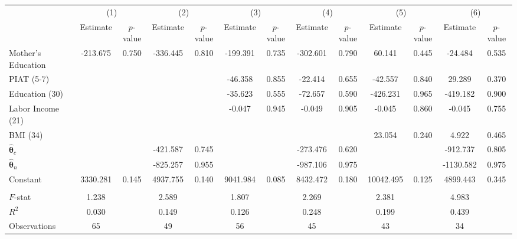 \begin{tabular}{lcccccccccccc} \toprule
 & \multicolumn{2}{c}{(1)}  &  \multicolumn{2}{c}{(2)}  &  \multicolumn{2}{c}{(3)}  &  \multicolumn{2}{c}{(4)}  & \multicolumn{2}{c}{(5)} & \multicolumn{2}{c}{(6)} \\  
 & Estimate & $p$-value & Estimate & $p$-value & Estimate & $p$-value & Estimate & $p$-value & Estimate & $p$-value & Estimate & $p$-value \\ \midrule
Mother's Education &  -213.675 &     0.750 &  -336.445 &     0.810 &  -199.391 &     0.735 &  -302.601 &     0.790 &    60.141 &     0.445 &   -24.484 &     0.535 \\  
PIAT (5-7) &         &         &         &         &   -46.358 &     0.855 &   -22.414 &     0.655 &   -42.557 &     0.840 &    29.289 &     0.370 \\  
Education (30) &         &         &         &         &   -35.623 &     0.555 &   -72.657 &     0.590 &  -426.231 &     0.965 &  -419.182 &     0.900 \\  
Labor Income (21) &         &         &         &         &    -0.047 &     0.945 &    -0.049 &     0.905 &    -0.045 &     0.860 &    -0.045 &     0.755 \\  
BMI (34) &         &         &         &         &         &         &         &         &    23.054 &     0.240 &     4.922 &     0.465 \\  
$\hat{\bm{\theta}}_c$ &         &         &  -421.587 &     0.745 &         &         &  -273.476 &     0.620 &         &         &  -912.737 &     0.805 \\  
$\hat{\bm{\theta}}_n$ &         &         &  -825.257 &     0.955 &         &         &  -987.106 &     0.975 &         &         & -1130.582 &     0.975 \\  
Constant &  3330.281 &     0.145 &  4937.755 &     0.140 &  9041.984 &     0.085 &  8432.472 &     0.180 & 10042.495 &     0.125 &  4899.443 &     0.345 \\  \\ \midrule
$F$-stat &     1.238 &      &     2.589 &      &     1.807 &      &     2.269 &      &     2.381 &   &     4.983 &    \\  
$R^2$ &     0.030 &     &     0.149 &      &     0.126 &    &     0.248 &    &     0.199 &   &     0.439 &   \\  
Observations &    65 &    &    49 &   &    56 &   &    45 &  &    43 &  &    34 &      \\  
\bottomrule \end{tabular}
